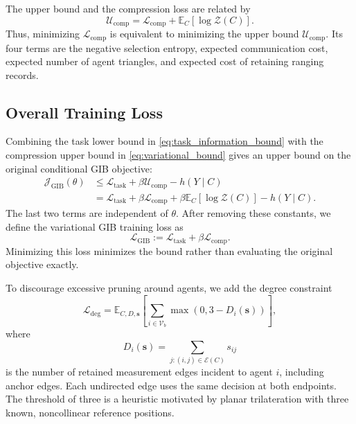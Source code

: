 The upper bound and the compression loss are related by
\begin{equation}
    \mathcal U_{\mathrm{comp}}
    =
    \mathcal L_{\mathrm{comp}}
    +\mathbb E_C[\log\mathcal Z(C)].
    \label{eq:compression_constant}
\end{equation}
Thus, minimizing $\mathcal L_{\mathrm{comp}}$ is equivalent to minimizing the upper bound $\mathcal U_{\mathrm{comp}}$. Its four terms are the negative selection entropy, expected communication cost, expected number of agent triangles, and expected cost of retaining ranging records.

{\color{blue}

\subsection{Overall Training Loss}
\label{sec:overall_training}
Combining the task lower bound in \eqref{eq:task_information_bound} with the compression upper bound in \eqref{eq:variational_bound} gives an upper bound on the original conditional GIB objective:
\begin{equation}
    \begin{aligned}
    \mathcal J_{\mathrm{GIB}}(\theta)
    &\le
    \mathcal L_{\mathrm{task}}
    +\beta\mathcal U_{\mathrm{comp}}
    -h(Y\mid C)\\
    &=
    \mathcal L_{\mathrm{task}}
    +\beta\mathcal L_{\mathrm{comp}}
    +\beta\mathbb E_C[\log\mathcal Z(C)]
    -h(Y\mid C).
    \end{aligned}
    \label{eq:gib_training_bound}
\end{equation}
The last two terms are independent of $\theta$. After removing these constants, we define the variational GIB training loss as
\begin{equation}
    \mathcal L_{\mathrm{GIB}}
    :=
    \mathcal L_{\mathrm{task}}
    +\beta\mathcal L_{\mathrm{comp}}.
    \label{eq:gib_train_objective}
\end{equation}
Minimizing this loss minimizes the bound rather than evaluating the original objective exactly.

To discourage excessive pruning around agents, we add the degree constraint
\begin{equation}
    \mathcal L_{\mathrm{deg}}
    =
    \mathbb E_{C,D,\mathbf s}
    \left[
    \sum_{i\in\mathcal V_b}
    \max(0,3-D_i(\mathbf s))
    \right],
    \label{eq:degree_loss}
\end{equation}
where
\[
    D_i(\mathbf s)
    =
    \sum_{j:(i,j)\in\mathcal E(C)}s_{ij}
\]
is the number of retained measurement edges incident to agent $i$, including anchor edges. Each undirected edge uses the same decision at both endpoints. The threshold of three is a heuristic motivated by planar trilateration with three known, noncollinear reference positions.

}
